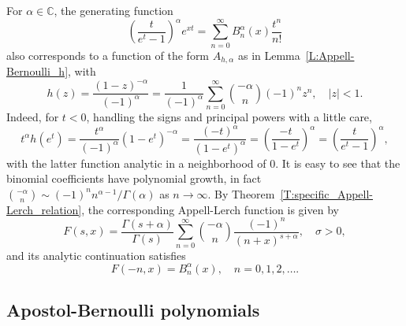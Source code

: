 \documentclass[11pt,a4paper]{amsart}
\newcommand{\C}{\mathbb{C}}
\theoremstyle{plain}
\theoremstyle{plain}
\theoremstyle{definition}
\theoremstyle{remark}
\begin{document}
For $\alpha \in \C$, the generating function
% 
\begin{equation*}
\left(\frac{t}{e^t-1}\right)^\alpha e^{xt} = \sum_{n=0}^\infty B^\alpha_{n}(x)\frac{t^n}{n!}
\end{equation*}
% 
also corresponds to a function of the form $A_{h,\alpha}$ as in Lemma~\ref{L:Appell-Bernoulli_h}, with 
\[
	  h(z) 
	= \frac{(1-z)^{-\alpha}}{(-1)^\alpha}
	= \frac{1}{(-1)^\alpha} \sum_{n=0}^\infty \binom{-\alpha}{n}(-1)^nz^n, \quad |z|<1.
\]
Indeed, for $t<0$, handling the signs and principal powers with a little care,
\[
      t^{\alpha} h(e^{t}) 
    = \frac{t^{\alpha}}{(-1)^{\alpha}} (1 - e^{t})^{-\alpha}
    = \frac{(-t)^{\alpha}}{(1 - e^{t})^{\alpha}}
	= \left(\frac{-t}{1-e^{t}}\right)^{\alpha}
	= \left(\frac{t}{e^{t}-1}\right)^{\alpha},
\]
with the latter function analytic in a neighborhood of $0$.
It is easy to see that the binomial coefficients have polynomial growth, in fact $\binom{-\alpha}{n} \sim (-1)^{n} n^{\alpha - 1} / \Gamma(\alpha)$ as $n \to \infty$. By Theorem~\ref{T:specific_Appell-Lerch_relation}, the corresponding Appell-Lerch function is given by
\[
	  F(s,x) 
	= \frac{\Gamma(s+\alpha)}{\Gamma(s)}
	\sum_{n=0}^\infty \binom{-\alpha}{n} \frac{(-1)^n}{(n + x)^{s+\alpha}},\quad \sigma>0,
\]
and its analytic continuation satisfies
\[
	F(-n,x) = B^\alpha_{n}(x),\quad n=0,1,2,\dots.
\]



\subsection{Apostol-Bernoulli polynomials}
\label{subsec:ApostolBernoulli}
\end{document}
